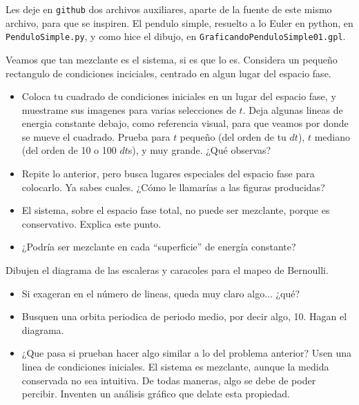 \documentclass[12pt]{article}
\newenvironment{question}[2][Pregunta]{\begin{trivlist}
\item[\hskip \labelsep {\bfseries #1}\hskip \labelsep {\bfseries #2.}]}{\end{trivlist}}
\begin{document}
Les deje en \verb:github: dos archivos auxiliares, aparte de la fuente de este mismo
archivo, para que se inspiren. El pendulo simple, resuelto a lo Euler en python,
en \verb:PenduloSimple.py:, y como hice el dibujo, en \verb:GraficandoPenduloSimple01.gpl:.


\begin{question}{1}
Veamos que tan mezclante es el sistema, si es que lo es. 
Considera un pequeño rectangulo de condiciones inciciales, centrado
en algun lugar del espacio fase. 
\begin{itemize} 
\item Coloca tu cuadrado de condiciones iniciales en un lugar del espacio fase,
y muestrame sus imagenes para varias selecciones de $t$. Deja algunas
lineas de energia constante debajo, como referencia visual,
para que veamos por donde se mueve el cuadrado. Prueba para $t$ pequeño (del
orden de tu $dt$),
$t$ mediano (del orden de 10 o 100 $dt$s), y muy grande. ¿Qué observas?
\item Repite lo anterior, pero busca lugares especiales del espacio fase
para colocarlo. Ya sabes cuales. ¿Cómo le llamarías a las figuras producidas?
\item El sistema, sobre el espacio fase total, no puede ser mezclante, porque es
conservativo. Explica este punto.
\item ¿Podría ser mezclante en cada ``superficie'' de energía constante?
\end{itemize}
\end{question}
 
\begin{question}{2}
Dibujen el diagrama de las escaleras y caracoles para el mapeo de Bernoulli.
\begin{itemize}
\item Si exageran en el número de lineas, queda muy claro algo... ¿qué?
\item Busquen una orbita periodica de periodo medio, por decir algo, 10. Hagan el diagrama.
\item ¿Que pasa si prueban hacer algo similar a lo del problema anterior? Usen una linea
de condiciones iniciales. El sistema es mezclante, aunque la medida conservada no sea intuitiva. 
De todas maneras, algo se debe de poder percibir. Inventen un análisis gráfico que
delate esta propiedad.
\end{itemize}  
\end{question}
\end{document}

